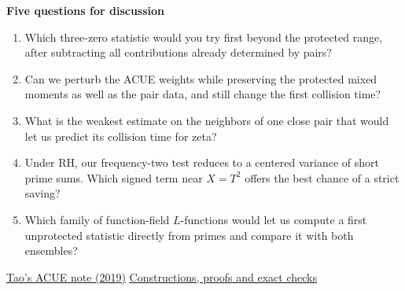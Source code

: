 \documentclass[10pt,letterpaper]{article}
\begin{document}
\textbf{Five questions for discussion}
\begin{enumerate}[leftmargin=*,nosep]
\item Which three-zero statistic would you try first beyond the protected range, after subtracting all contributions already determined by pairs?
\item Can we perturb the ACUE weights while preserving the protected mixed moments as well as the pair data, and still change the first collision time?
\item What is the weakest estimate on the neighbors of one close pair that would let us predict its collision time for zeta?
\item Under RH, our frequency-two test reduces to a centered variance of short prime sums. Which signed term near $X=T^2$ offers the best chance of a strict saving?
\item Which family of function-field $L$-functions would let us compute a first unprotected statistic directly from primes and compare it with both ensembles?
\end{enumerate}
{\small \href{https://terrytao.wordpress.com/2019/05/08/the-alternative-hypothesis-for-unitary-matrices/}{Tao's ACUE note (2019)}\quad
\href{https://github.com/QingyunSun/Riemann-hypothesis-and-random-matrix/tree/4b96cd9/research/counterexamples}{Constructions, proofs and exact checks}}
\end{document}
